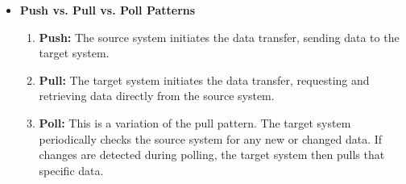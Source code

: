 \begin{itemize}
\begin{itemize}
        
        \item \textbf{Schema and Data Types:}
        \footnote{
            Understanding the source schema can be difficult,
            especially with complex schemas generated by tools
            like Object-Relational Mappers (ORMs) or opaque
            vendor APIs. Data engineers may need to delve into
            application internals or communicate extensively.
        }
        Describes the fields and their types within structured
        (tabular) or semi-structured (JSON) data. Unstructured data
        lacks a formal schema but may have technical descriptions.

        Source schemas frequently change
        (columns added/renamed/changed, tables added). 

        \item \textbf{Metadata:} Data about the data payload
        (includes schema, but also other descriptive info).
        Metadata is crucial for making data understandable and
        usable; its absence was a key failing of early data lakes
        ("data swamps").
    \end{itemize}



    \item \textbf{Push vs. Pull vs. Poll Patterns}
    
    \noindent
    \begin{enumerate}
        \item \textbf{Push:} The source system initiates the data
        transfer, sending data to the target system.

        \item \textbf{Pull:} The target system initiates the data
        transfer, requesting and retrieving data directly from
        the source system.

        \item \textbf{Poll:} This is a variation of the pull
        pattern. The target system periodically checks the source
        system for any new or changed data. If changes are detected
        during polling, the target system then pulls that specific
        data.        
    \end{enumerate}
\end{itemize}



